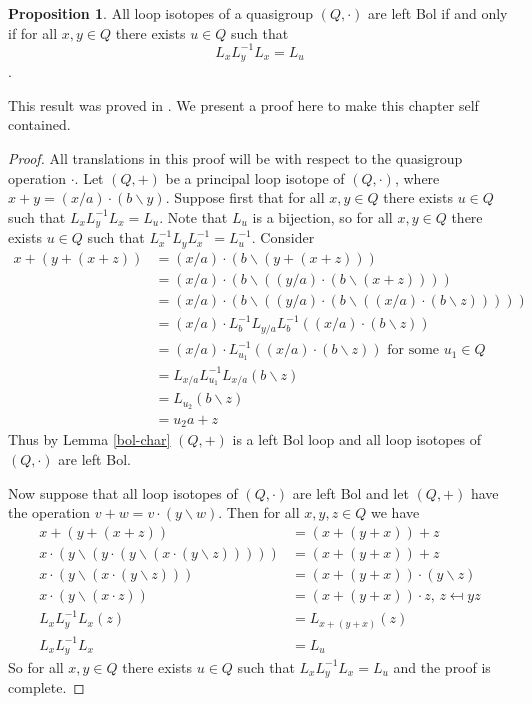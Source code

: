 \documentclass[12pt]{report}
\theoremstyle{definition}
\newtheorem{prp}[thm]{Proposition}
\newcommand{\ldv}{\backslash}       %
\newcommand{\rdv}{/}                %
\begin{document}
\begin{prp}\label{iso-char}
  All loop isotopes of a quasigroup $(Q, \cdot)$ are left Bol if and only if for all $x, y\in Q$ there
    exists $u\in Q$ such that
  \[L_{x} L_{y}^{-1} L_x = L_u\].
\end{prp}

This result was proved in \cite{BK-isotopes}. We present a proof here to make this chapter self contained.

\begin{proof}
 All translations in this proof will be with respect to the quasigroup operation $\cdot$. Let $(Q, +)$
  be a principal loop isotope of $(Q, \cdot)$, where $x + y = (x\rdv a)\cdot (b\ldv y)$. Suppose
  first that for all $x, y\in Q$ there exists $u\in Q$ such that $L_x L_y^{-1} L_x = L_u$. Note
  that $L_u$ is a bijection, so for all $x, y\in Q$ there exists $u\in Q$ such that
  $L_x^{-1  }L_yL_x^{-1} = L_u^{-1}$. Consider
  \begin{align*}
    x + (y + (x + z)) &= (x\rdv a) \cdot (b\ldv (y + (x + z)))\\
    &= (x\rdv a)\cdot (b\ldv((y\rdv a)\cdot (b\ldv(x + z))))\\
    &= (x\rdv a)\cdot (b\ldv((y\rdv a)\cdot (b\ldv((x\rdv a)\cdot (b\ldv z)))))\\
    &= (x\rdv a)\cdot L_b^{-1} L_{y\rdv a} L_b^{-1}((x\rdv a)\cdot (b\ldv z))\\
    &= (x\rdv a)\cdot L_{u_1}^{-1}((x\rdv a)\cdot (b\ldv z))\text{ for some $u_1\in Q$}\\
    &= L_{x\rdv a}L_{u_1}^{-1}L_{x\rdv a}(b\ldv z)\\
    &= L_{u_2}(b\ldv z)\\
    &= u_2 a + z
  \end{align*}
  Thus by Lemma \ref{bol-char} $(Q, +)$ is a left Bol loop and all loop isotopes of $(Q, \cdot)$ are left Bol.

  Now suppose that all loop isotopes of $(Q, \cdot)$ are left Bol and let $(Q, +)$ have the operation
    $v + w = v\cdot (y\ldv w)$. Then for all $x, y, z\in Q$ we have
  \begin{align*}
    x + (y + (x + z)) &= (x + (y + x)) + z\\
    x\cdot (y\ldv (y\cdot (y\ldv (x\cdot (y\ldv z))))) &= (x + (y + x)) + z\\
    x\cdot (y\ldv (x\cdot (y\ldv z))) &= (x + (y + x))\cdot (y\ldv z)\\
    x\cdot (y\ldv (x\cdot z)) &= (x + (y + x))\cdot z\text{, $z\mapsfrom yz$}\\
    L_x L_y^{-1} L_x (z) &= L_{x + (y + x)}(z)\\
    L_x L_y^{-1} L_x &= L_u
  \end{align*}
  So for all $x, y\in Q$ there exists $u\in Q$ such that $L_x L_y^{-1} L_x = L_u$ and the proof is complete.
\end{proof}
\end{document}
